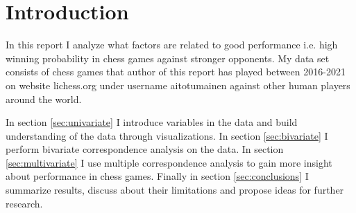 \section{Introduction}

In this report I analyze what factors are related to good performance i.e. high winning probability in chess games against stronger opponents. My data set consists of chess games that author of this report has played between 2016-2021 on website lichess.org under username aitotumainen against other human players around the world.

In section \ref{sec:univariate} I introduce variables in the data and build understanding of the data through visualizations. In section \ref{sec:bivariate} I perform bivariate correspondence analysis on the data. In section \ref{sec:multivariate} I use multiple correspondence analysis to gain more insight about performance in chess games. Finally in section \ref{sec:conclusions} I summarize results, discuss about their limitations and propose ideas for further research.